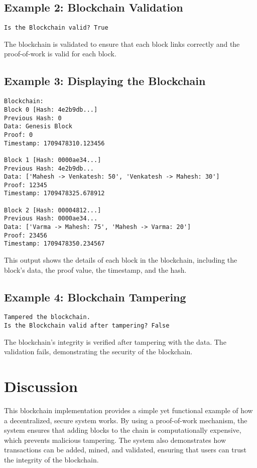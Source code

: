 \documentclass[sigconf]{acmart}
\begin{document}
\subsection{Example 2: Blockchain Validation}
\begin{verbatim}
Is the Blockchain valid? True
\end{verbatim}
The blockchain is validated to ensure that each block links correctly and the proof-of-work is valid for each block.

\subsection{Example 3: Displaying the Blockchain}
\begin{verbatim}
Blockchain:
Block 0 [Hash: 4e2b9db...]
Previous Hash: 0
Data: Genesis Block
Proof: 0
Timestamp: 1709478310.123456

Block 1 [Hash: 0000ae34...]
Previous Hash: 4e2b9db...
Data: ['Mahesh -> Venkatesh: 50', 'Venkatesh -> Mahesh: 30']
Proof: 12345
Timestamp: 1709478325.678912

Block 2 [Hash: 00004812...]
Previous Hash: 0000ae34...
Data: ['Varma -> Mahesh: 75', 'Mahesh -> Varma: 20']
Proof: 23456
Timestamp: 1709478350.234567
\end{verbatim}
This output shows the details of each block in the blockchain, including the block's data, the proof value, the timestamp, and the hash.

\subsection{Example 4: Blockchain Tampering}
\begin{verbatim}
Tampered the blockchain.
Is the Blockchain valid after tampering? False
\end{verbatim}
The blockchain’s integrity is verified after tampering with the data. The validation fails, demonstrating the security of the blockchain.

\section{Discussion}

This blockchain implementation provides a simple yet functional example of how a decentralized, secure system works. By using a proof-of-work mechanism, the system ensures that adding blocks to the chain is computationally expensive, which prevents malicious tampering. The system also demonstrates how transactions can be added, mined, and validated, ensuring that users can trust the integrity of the blockchain.
\end{document}
